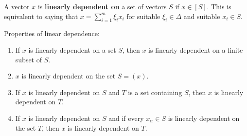 A vector $x$ is \textbf{linearly dependent on} a set of vectors $S$ if $x \in [S]$. This is equivalent to saying that $x = \sum_{i=1}^{m} \xi_i x_i$ for suitable $\xi_i \in \Delta$ and suitable $x_i \in S$.

Properties of linear dependence:
\begin{enumerate}
\item If $x$ is linearly dependent on a set $S$, then $x$ is linearly dependent on a finite subset of $S$.
\item $x$ is linearly dependent on the set $S = (x)$.
\item If $x$ is linearly dependent on $S$ and $T$ is a set containing $S$, then $x$ is linearly dependent on $T$.
\item If $x$ is linearly dependent on $S$ and if every $x_\alpha \in S$ is linearly dependent on the set $T$, then $x$ is linearly dependent on $T$.
\end{enumerate}
